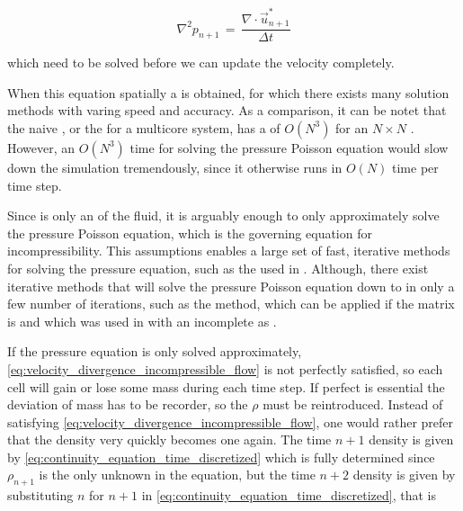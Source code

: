 \begin{equation} \label{eq:pressure_poissin_equation_incompressible_flow}
\nabla^2 p_{n+1} \,=\, \frac{\nabla\cdot\vec{u}^*_{n+1}}{\Delta t}
\end{equation}

which need to be solved before we can update the velocity completely.

When  this equation spatially a  is obtained, for which there exists many solution methods with varing speed and accuracy. As a comparison, it can be notet that the naive  \algorithm, or the  \algorithm for a multicore system, has a  of $O(N^3)$ for an $N\times N$ . However, an $O(N^3)$ time for solving the pressure Poisson equation would slow down the simulation tremendously, since it otherwise runs in $O(N)$ time per time step.

Since \incompressibility is only an \approximate \property of the fluid, it is arguably enough to only approximately solve the pressure Poisson equation, which is the governing equation for incompressibility. This assumptions enables a large set of fast, iterative methods for solving the pressure equation, such as the   used in \citep{Popinet2003}. Although, there exist iterative methods that will solve the pressure Poisson equation down to  in only a few number of iterations, such as the \PCG method, which can be applied if the matrix is  and which was used in \citep{Losasso2004} with an incomplete  as \preconditioner.

If the pressure equation is only solved approximately, \eqref{eq:velocity_divergence_incompressible_flow} is not perfectly satisfied, so each cell will gain or lose some mass during each time step. If perfect  is essential the deviation of mass has to be recorder, so the  $\rho$ must be reintroduced. Instead of satisfying \eqref{eq:velocity_divergence_incompressible_flow}, one would rather prefer that the density very quickly becomes one again. The time $n+1$ density is given by \eqref{eq:continuity_equation_time_discretized} which is fully determined since $\rho_{n+1}$ is the only unknown in the equation, but the time $n+2$ density is given by substituting $n$ for $n+1$ in \eqref{eq:continuity_equation_time_discretized}, that is

